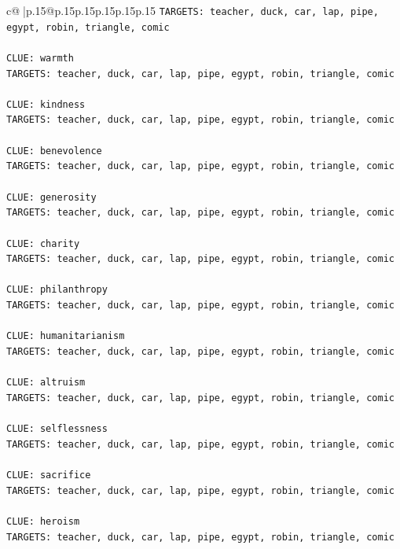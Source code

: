 \documentclass{article}
\begin{document}
{\begin{supertabular}{c@{$\;$}|p{.15\linewidth}@{}p{.15\linewidth}p{.15\linewidth}p{.15\linewidth}p{.15\linewidth}p{.15\linewidth}}
{{{\texttt{TARGETS: teacher, duck, car, lap, pipe, egypt, robin, triangle, comic} \\
\\ 
\texttt{CLUE: warmth} \\
\texttt{TARGETS: teacher, duck, car, lap, pipe, egypt, robin, triangle, comic} \\
\\ 
\texttt{CLUE: kindness} \\
\texttt{TARGETS: teacher, duck, car, lap, pipe, egypt, robin, triangle, comic} \\
\\ 
\texttt{CLUE: benevolence} \\
\texttt{TARGETS: teacher, duck, car, lap, pipe, egypt, robin, triangle, comic} \\
\\ 
\texttt{CLUE: generosity} \\
\texttt{TARGETS: teacher, duck, car, lap, pipe, egypt, robin, triangle, comic} \\
\\ 
\texttt{CLUE: charity} \\
\texttt{TARGETS: teacher, duck, car, lap, pipe, egypt, robin, triangle, comic} \\
\\ 
\texttt{CLUE: philanthropy} \\
\texttt{TARGETS: teacher, duck, car, lap, pipe, egypt, robin, triangle, comic} \\
\\ 
\texttt{CLUE: humanitarianism} \\
\texttt{TARGETS: teacher, duck, car, lap, pipe, egypt, robin, triangle, comic} \\
\\ 
\texttt{CLUE: altruism} \\
\texttt{TARGETS: teacher, duck, car, lap, pipe, egypt, robin, triangle, comic} \\
\\ 
\texttt{CLUE: selflessness} \\
\texttt{TARGETS: teacher, duck, car, lap, pipe, egypt, robin, triangle, comic} \\
\\ 
\texttt{CLUE: sacrifice} \\
\texttt{TARGETS: teacher, duck, car, lap, pipe, egypt, robin, triangle, comic} \\
\\ 
\texttt{CLUE: heroism} \\
\texttt{TARGETS: teacher, duck, car, lap, pipe, egypt, robin, triangle, comic} \\
}}}
\end{supertabular}}
\end{document}
